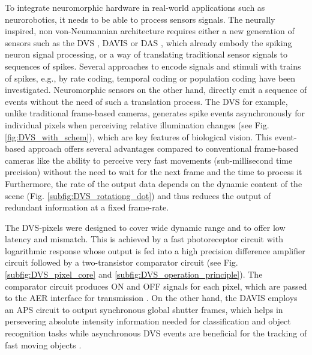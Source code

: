 To integrate neuromorphic hardware in real-world applications such as neurorobotics, it needs to be able to process sensors signals.
The neurally inspired, non von-Neumannian architecture requires either a new generation of sensors such as the \ac{DVS} \parencite{Lichtsteiner2008}, \ac{DAVIS} \parencite{Brandli2014} or \ac{DAS} \parencite{Liu2014}, which already embody the spiking neuron signal processing, or a way of translating traditional sensor signals to sequences of spikes.
Several approaches to encode signals and stimuli with trains of spikes, e.g., by rate coding, temporal coding \parencite[Chap. 7.6]{Gerstner2014} or population coding \parencites[Chap. 1]{Gerstner2002}{Ponulak2011} have been investigated.
Neuromorphic sensors on the other hand, directly emit a sequence of events without the need of such a translation process.
The \ac{DVS} for example, unlike traditional frame-based cameras, generates spike events \parencite{Lichtsteiner2008} asynchronously for individual pixels when perceiving relative illumination changes (see Fig. \ref{fig:DVS_with_schem}), which are key features of biological vision.
This event-based approach offers several advantages compared to conventional frame-based cameras like the ability to perceive very fast movements (sub-millisecond time precision) without the need to wait for the next frame and the time to process it
Furthermore, the rate of the output data depends on the dynamic content of the scene (Fig. \ref{subfig:DVS_rotationg_dot}) and thus reduces the output of redundant information at a fixed frame-rate.

The \ac{DVS}-pixels were designed to cover wide dynamic range and to offer low latency and mismatch.
This is achieved by a fast photoreceptor circuit with logarithmic response whose output is fed into a high precision difference amplifier circuit followed by a two-transistor comparator circuit (see Fig. \ref{subfig:DVS_pixel_core} and \ref{subfig:DVS_operation_principle}).
The comparator circuit produces ON and OFF signals for each pixel, which are passed to the \ac{AER} interface for transmission \parencite{Lichtsteiner2008}.
On the other hand, the \ac{DAVIS} employs an \ac{APS} circuit to output synchronous global shutter frames, which helps in persevering absolute intensity information needed for classification and object recognition tasks while asynchronous \ac{DVS} events are beneficial for the tracking of fast moving objects \parencite{Brandli2014}.

